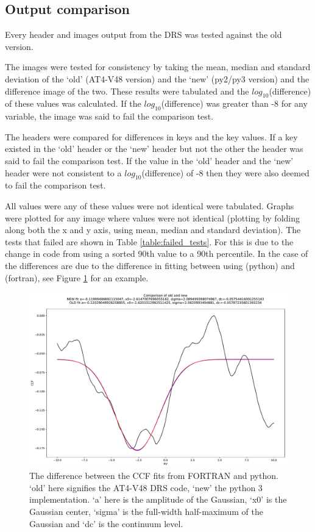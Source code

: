 \subsection{Output comparison}

Every header and images output from the DRS was tested against the old version. 

The images were tested for consistency by taking the mean, median and standard deviation of the `old' (AT4-V48 version) and the `new' (py2/py3 version) and the difference image of the two. These results were tabulated and the $log_{10}$(difference) of these values was calculated. If the $log_{10}$(difference) was greater than -8 for any variable, the image was said to fail the comparison test.

The headers were compared for differences in keys and the key values. If a key existed in the `old' header or the `new' header but not the other the header was said to fail the comparison test. If the value in the `old' header and the `new' header were not consistent to a $log_{10}$(difference) of -8 then they were also deemed to fail the comparison test.

All values were any of these values were not identical were tabulated. Graphs were plotted for any image where values were not identical (plotting by folding along both the x and y axis, using mean, median and standard deviation). The tests that failed are shown in Table \ref{table:failed_tests}.
For \calbadpix this is due to the change in code from using a sorted 90th value to a 90th percentile. In the case of \calCCF the differences are due to the difference in fitting between using  (python) and  (fortran), see Figure \ref{figure:ccf_fitting_probelm} for an example.


\begin{figure}
\begin{center}
\includegraphics[width=.8\textwidth]{Figures/CCF_fitting_difference.pdf}
\end{center}
\caption{ The difference between the CCF fits from FORTRAN and python. `old' here signifies the AT4-V48 DRS code, `new' the python 3 implementation. `a' here is the amplitude of the Gaussian, `x0' is the Gaussian center, `sigma' is the full-width half-maximum of the Gaussian and `dc' is the continuum level. \label{figure:ccf_fitting_probelm}}
\end{figure}

